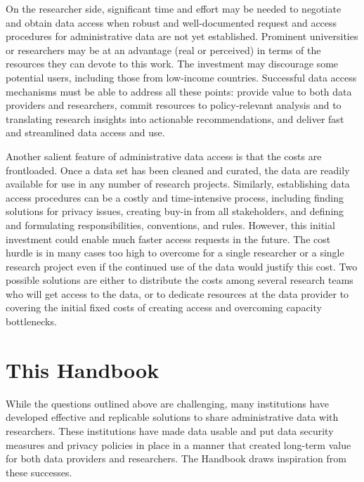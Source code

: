 On the researcher side, significant time and effort may be needed to negotiate and obtain data access when robust and well-documented request and access procedures for administrative data are not yet established. Prominent universities or researchers may be at an advantage (real or perceived) in terms of the resources they can devote to this work. The investment may discourage some potential users, including those from low-income countries. Successful data access mechanisms must be able to address all these points: provide value to both data providers and researchers, commit resources to policy-relevant analysis and to translating research insights into actionable recommendations, and deliver fast and streamlined data access and use.

Another salient feature of administrative data access is that the costs are frontloaded. Once a data set has been cleaned and curated, the data are readily available for use in any number of research projects. Similarly, establishing data access procedures can be a costly and time-intensive process, including finding solutions for privacy issues, creating buy-in from all stakeholders, and defining and formulating responsibilities, conventions, and rules. However, this initial investment could enable much faster access requests in the future. The cost hurdle is in many cases too high to overcome for a single researcher or a single research project even if the continued use of the data would justify this cost. Two possible solutions are either to distribute the costs among several research teams who will get access to the data, or to dedicate resources at the data provider to covering the initial fixed costs of creating access and overcoming capacity bottlenecks.

\hypertarget{this-handbook}{%
\section{This Handbook}\label{this-handbook}}

While the questions outlined above are challenging, many institutions have developed effective and replicable solutions to share administrative data with researchers. These institutions have made data usable and put data security measures and privacy policies in place in a manner that created long-term value for both data providers and researchers. The Handbook draws inspiration from these successes.

